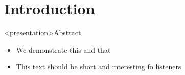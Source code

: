 

\maketitle           %
\frame{\titlepage}   %






\section*{Introduction}
  \begin{frame}<presentation>{Abstract}
    \begin{itemize}
      \item[\cmark] We demonstrate this and that \cite{volkov_long-range_2011}
            \vspace{3mm}
      \item[\cmark] This text should be short and interesting fo listeners \cite{kharitonov_data_2014}
    \end{itemize}
  \end{frame}






